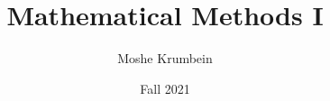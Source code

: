 
\usepackage{subfiles}
\title{Mathematical Methods I}
\author{Moshe Krumbein}
\date{Fall 2021}


\maketitle
{}
\setcounter{tocdepth}{2}
\tableofcontents
\cleardoublepage













